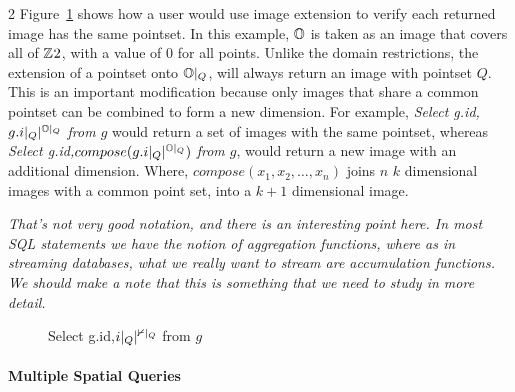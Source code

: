 \documentclass[10pt,letter]{article}
\begin{document}
\begin{multicols}{2}
Figure~\ref{fig:extension} shows how a user would use image extension to
verify each returned image has the same pointset.  In this example,
$\Bbb{O}$ is taken as an image that covers all of $\mathbb{Z}^{}{2}$, with a
value of 0 for all points.  Unlike the domain restrictions, the
extension of a pointset onto $\Bbb{O}|_Q$, will always return an
image with pointset $Q$.  This is an important modification because
only images that share a common pointset can be combined to form a new
dimension.  For example, \emph{Select g.id,$g.i|_Q|^{\Bbb{O}|_Q}$ from
  $g$} would return a set of images with the same pointset, whereas
\emph{Select g.id,$compose(g.i|_Q|^{\Bbb{O}|_Q})$ from $g$}, would
return a new image with an additional dimension.  Where,
$compose(x_1,x_2,\ldots,x_n)$ joins $n$ $k$ dimensional images with a
common point set, into a $k+1$ dimensional image.

\emph{ That's not very good notation, and there is an interesting
  point here.  In most SQL statements we have the notion of
  aggregation functions, where as in streaming databases, what we
  really want to stream are accumulation functions.  We should make a
  note that this is something that we need to study in more detail.}

\begin{figure*}[htbp]
  \centering
  \caption{Select g.id,$i|_Q|^{\Bbb{0}|_Q}$ from $g$}
  \label{fig:extension}
\end{figure*} 

\paragraph{Multiple Spatial Queries}


\end{multicols}
\end{document}
